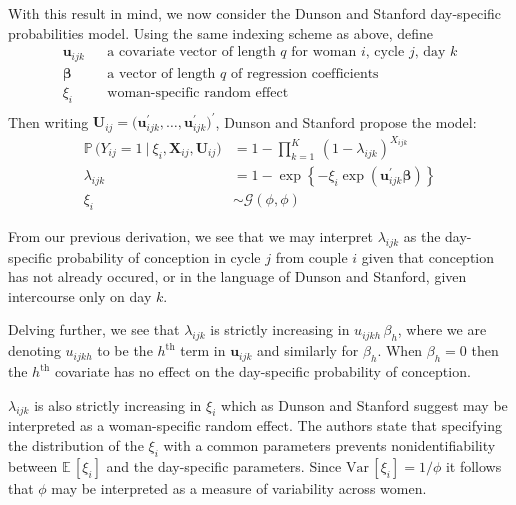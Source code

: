 \documentclass[11pt]{article}
\newcommand{\prob}{\mathbb{P}\,}
\newcommand{\ev}{\mathbb{E}\,}
\newcommand{\var}{\text{Var}\,}
\renewcommand{\vec}{\boldsymbol}
\begin{document}
With this result in mind, we now consider the Dunson and Stanford day-specific probabilities model.  Using the same indexing scheme as above, define
\[ \begin{array}{lll}
\vec{u}_{ijk} & & \text{a covariate vector of length $q$ for  woman $i$, cycle $j$, day $k$} \\[1ex]
\vec{\beta} & & \text{a vector of length $q$ of regression coefficients} \\[1ex]
\xi_i & & \text{woman-specific random effect} \\
\end{array} \]
Then writing $\vec{U}_{ij} = \big( \vec{u}_{ijk}^\prime, \dots, \vec{u}_{ijk}^\prime \big)^\prime$, Dunson and Stanford propose the model:
\begin{align}
\prob\Big( Y_{ij} = 1 ~\big|~ \xi_i, \vec{X}_{ij}, \vec{U}_{ij} \Big) &= 1 - \prod_{k=1}^K\, (1 - \lambda_{ijk})^{X_{ijk}} \nonumber \\
\lambda_{ijk} &= 1 - \exp\left\{ -\xi_i \exp\left( \vec{u}_{ijk}^\prime \vec{\beta} \right) \right\} \nonumber \\[1ex]
\xi_i &\sim \mathcal{G}(\phi,\phi)
\end{align}

\noindent From our previous derivation, we see that we may interpret $\lambda_{ijk}$ as the day-specific probability of conception in cycle $j$ from couple $i$ given that conception has not already occured, or in the language of Dunson and Stanford, given intercourse only on day $k$.

Delving further, we see that $\lambda_{ijk}$ is strictly increasing in $u_{ijkh}\, \beta_{h}$, where we are denoting $u_{ijkh}$ to be the $h^{\text{th}}$ term in $\vec{u}_{ijk}$ and similarly for $\beta_h$.  When $\beta_h = 0$ then the $h^{\text{th}}$ covariate has no effect on the day-specific probability of conception.

$\lambda_{ijk}$ is also strictly increasing in $\xi_i$ which as Dunson and Stanford suggest may be interpreted as a woman-specific random effect.  The authors state that specifying the distribution of the $\xi_i$ with a common parameters prevents nonidentifiability between $\ev [\xi_i]$ and the day-specific parameters.  Since $\var[\xi_i] = 1 / \phi$ it follows that $\phi$ may be interpreted as a measure of variability across women. 




\end{document}
